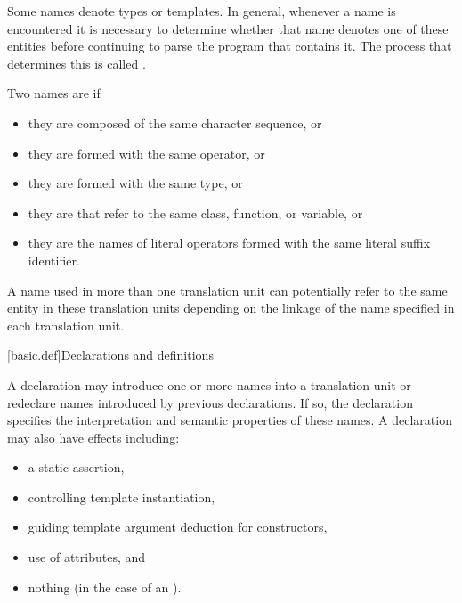 \pnum
Some names denote types or templates. In general,
whenever a name is encountered it is necessary to determine whether that name denotes
one of these entities before continuing to parse the program that contains it. The
process that determines this is called
.

\pnum
Two names are  if
\begin{itemize}
\item they are  composed of the same character sequence, or
\item they are  formed with
the same operator, or
\item they are  formed
with the same type, or
\item they are  that refer to the same class,
function, or variable, or
\item they are the names of literal operators formed with
the same literal suffix identifier.
\end{itemize}

\pnum
{}%
%
A name used in more than one translation unit can potentially
refer to the same entity in these translation units depending on the
linkage of the name specified in each
translation unit.

[basic.def]{Declarations and definitions}

\pnum
{}%
%
%
A declaration may introduce
one or more names into a translation
unit or redeclare names introduced by previous declarations.
If so, the
declaration specifies the interpretation and semantic properties of these names.
A declaration may also have effects including:
\begin{itemize}
\item a static assertion,
\item controlling template instantiation,
\item guiding template argument deduction for constructors,
\item use of attributes, and
\item nothing (in the case of an ).
\end{itemize}

